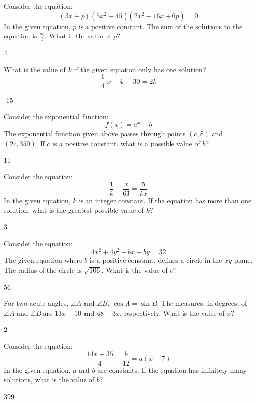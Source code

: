 \question[1]
Consider the equation:
\[
  (3x + p)\left(5x^2 - 45\right)\left(2x^2 - 16x + 6p\right) = 0
\]
In the given equation, $p$ is a positive constant. The sum of the solutions to the equation is $\frac{20}{3}$. What is the value of $p$?
\begin{solution}
4
\end{solution}

\question[1]
What is the value of $k$ if the given equation only has one solution?
\[
  \frac{1}{4}|x-4|-30=2k
\]
\begin{solution}
-15
\end{solution}


\newpage




\question[1]
Consider the exponential function:
\[
  f(x)=a^x-b
\]
The exponential function given above passes through points $(c, 8)$ and $(2c, 350)$. If $c$ is a positive constant, what is a possible value of $b$?
\begin{solution}
11
\end{solution}

\question[1]
Consider the equation:
\[
  \frac{1}{k}-\frac{x}{63}=\frac{5}{kx}
\]
In the given equation, $k$ is an integer constant. If the equation has more than one solution, what is the greatest possible value of $k$?
\begin{solution}
3
\end{solution}

\question[1]
Consider the equation:
\[
  4x^2+4y^2+bx+by=32
\]
The given equation where $b$ is a positive constant, defines a circle in the $xy$-plane. The radius of the circle is $\sqrt{106}$. What is the value of $b$?
\begin{solution}
56
\end{solution}



\newpage




\question[1]
For two acute angles, $\angle A$ and $\angle B$, $\cos A=\sin B$. The measures, in degrees, of $\angle A$ and $\angle B$ are $13x+10$ and $48+3x$, respectively. What is the value of $x$?
\begin{solution}
2
\end{solution}

\question[1]
Consider the equation:
\[
  \frac{14x+35}{4}-\frac{b}{12}=a(x-7)
\]
In the given equation, $a$ and $b$ are constants. If the equation has infinitely many solutions, what is the value of $b$?
\begin{solution}
399
\end{solution}


